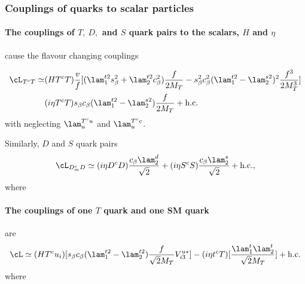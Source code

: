       

\subsubsection*{Couplings of quarks to scalar particles }


\paragraph{The couplings of $T,~D,$ and $S$ quark pairs to the scalars, $H$ and $\eta$} cause the flavour changing couplings 

\begin{align}
 \cL_{T^c T} \simeq &(H T^c T) \frac{v}{f} [(\lam_1^{t2}s_\beta^2 + \lam_2^{t2}c_\beta^2)\frac{f}{2M_T} - s_\beta^2 c_\beta^2(\lam_1^{t2} - \lam_2^{s2})^2\frac{f^3}{2M_T^3}  ]\nonumber\\
  & (i\eta T^c T) s_\beta c_\beta (\lam_1^{t2} - \lam_2^{s2}) \frac{f}{2M_T} + {\rm{h.c.}} 
\end{align}
with neglecting $\lam_u^{T^c u}$ and $\lam_u^{T^c c}$.

Similarly, $D$ and $S$ quark pairs 
\begin{align}
 \cL_{D_m^c D} \simeq (i\eta D^c D) \frac{c_\beta \lam_2^{d}}{\sqrt{2}}  + (i\eta S^c S) \frac{c_\beta \lam_2^s}{\sqrt{2}}+ {\rm{h.c.}},  
\end{align}
where 


\paragraph{The couplings of one $T$ quark and one SM quark} are 
\begin{align}
 \cL \simeq (HT^c u_i) [s_\beta c_\beta (\lam_1^{t2} - \lam_2^{t2})\frac{f}{\sqrt{2}M_T} V_{i3}^{u*} ] 
 - (i\eta t^c T) [\frac{\lam_1^t \lam_2^t}{\sqrt{2}M_T} ] + {\rm{h.c.}}
\end{align}
where 

